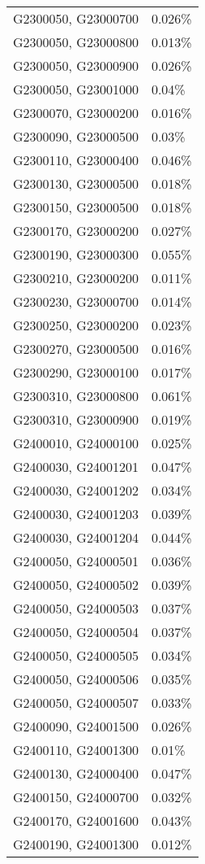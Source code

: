 \begin{longtable}[]{@{}ll@{}}
G2300050, G23000700 & 0.026\% \\
G2300050, G23000800 & 0.013\% \\
G2300050, G23000900 & 0.026\% \\
G2300050, G23001000 & 0.04\% \\
G2300070, G23000200 & 0.016\% \\
G2300090, G23000500 & 0.03\% \\
G2300110, G23000400 & 0.046\% \\
G2300130, G23000500 & 0.018\% \\
G2300150, G23000500 & 0.018\% \\
G2300170, G23000200 & 0.027\% \\
G2300190, G23000300 & 0.055\% \\
G2300210, G23000200 & 0.011\% \\
G2300230, G23000700 & 0.014\% \\
G2300250, G23000200 & 0.023\% \\
G2300270, G23000500 & 0.016\% \\
G2300290, G23000100 & 0.017\% \\
G2300310, G23000800 & 0.061\% \\
G2300310, G23000900 & 0.019\% \\
G2400010, G24000100 & 0.025\% \\
G2400030, G24001201 & 0.047\% \\
G2400030, G24001202 & 0.034\% \\
G2400030, G24001203 & 0.039\% \\
G2400030, G24001204 & 0.044\% \\
G2400050, G24000501 & 0.036\% \\
G2400050, G24000502 & 0.039\% \\
G2400050, G24000503 & 0.037\% \\
G2400050, G24000504 & 0.037\% \\
G2400050, G24000505 & 0.034\% \\
G2400050, G24000506 & 0.035\% \\
G2400050, G24000507 & 0.033\% \\
G2400090, G24001500 & 0.026\% \\
G2400110, G24001300 & 0.01\% \\
G2400130, G24000400 & 0.047\% \\
G2400150, G24000700 & 0.032\% \\
G2400170, G24001600 & 0.043\% \\
G2400190, G24001300 & 0.012\% \\

\end{longtable}

